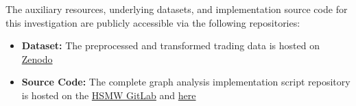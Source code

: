 \documentclass[language=english,thesis=bachelor,nosecondtitle,faculty=cb,onesided,12pt]{hsmw-thesis}
\begin{document}
\clearpage

\appendix %

\thispagestyle{plain}

The auxiliary resources, underlying datasets, and implementation source code for this investigation are publicly accessible via the following repositories:

\begin{itemize}
    \item \textbf{Dataset:} The preprocessed and transformed trading data is hosted on  \href{https://zenodo.org/records/4540223}{Zenodo}
    \item \textbf{Source Code:} The complete graph analysis implementation script repository is hosted on the \href{https://git.hs-mittweida.de/frafique/preliminary-investigation-of-wash-trading-detection-on-etherdelta-using-graph-based-methods.git}{HSMW GitLab}  and  \href{https://git.hs-mittweida.de/frafique/preliminary-investigation-of-wash-trading-detection-on-etherdelta-using-graph-based-methods.git}{here}
\end{itemize}
\end{document}
